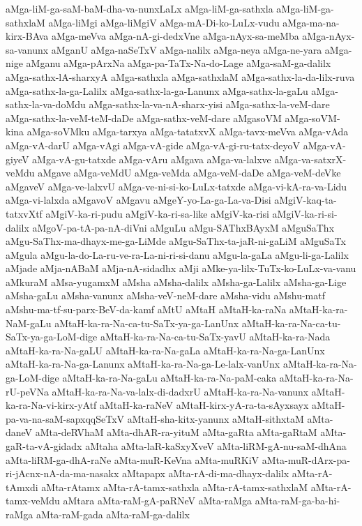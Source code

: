 {aMga-liM-ga-saM-baM-dha-va-nunxLaLx
aMga-liM-ga-sathxla
aMga-liM-ga-sathxlaM
aMga-liMgi
aMga-liMgiV
aMga-mA-Di-ko-LuLx-vudu
aMga-ma-na-kirx-BAva
aMga-meVva
aMga-nA-gi-dedxVne
aMga-nAyx-sa-meMba
aMga-nAyx-sa-vanunx
aMganU
aMga-naSeTxV
aMga-nalilx
aMga-neya
aMga-ne-yara
aMga-nige
aMganu
aMga-pArxNa
aMga-pa-TaTx-Na-do-Lage
aMga-saM-ga-dalilx
aMga-sathx-lA-sharxyA
aMga-sathxla
aMga-sathxlaM
aMga-sathx-la-da-lilx-ruva
aMga-sathx-la-ga-Lalilx
aMga-sathx-la-ga-Lanunx
aMga-sathx-la-gaLu
aMga-sathx-la-va-doMdu
aMga-sathx-la-va-nA-sharx-yisi
aMga-sathx-la-veM-dare
aMga-sathx-la-veM-teM-daDe
aMga-sathx-veM-dare
aMgasoVM
aMga-soVM-kina
aMga-soVMku
aMga-tarxya
aMga-tatatxvX
aMga-tavx-meVva
aMga-vAda
aMga-vA-darU
aMga-vAgi
aMga-vA-gide
aMga-vA-gi-ru-tatx-deyoV
aMga-vA-giyeV
aMga-vA-gu-tatxde
aMga-vAru
aMgava
aMga-va-lalxve
aMga-va-satxrX-veMdu
aMgave
aMga-veMdU
aMga-veMda
aMga-veM-daDe
aMga-veM-deVke
aMgaveV
aMga-ve-lalxvU
aMga-ve-ni-si-ko-LuLx-tatxde
aMga-vi-kA-ra-va-Lidu
aMga-vi-lalxda
aMgavoV
aMgavu
aMgeY-yo-La-ga-La-va-Disi
aMgiV-kaq-ta-tatxvXtf
aMgiV-ka-ri-pudu
aMgiV-ka-ri-sa-like
aMgiV-ka-risi
aMgiV-ka-ri-si-dalilx
aMgoV-pa-tA-pa-nA-diVni
aMguLu
aMgu-SAThxBAyxM
aMguSaThx
aMgu-SaThx-ma-dhayx-me-ga-LiMde
aMgu-SaThx-ta-jaR-ni-gaLiM
aMguSaTx
aMgula
aMgu-la-do-La-ru-ve-ra-La-ni-ri-si-danu
aMgu-la-gaLa
aMgu-li-ga-Lalilx
aMjade
aMja-nABaM
aMja-nA-sidadhx
aMji
aMke-ya-lilx-TuTx-ko-LuLx-va-vanu
aMkuraM
aMsa-yugamxM
aMsha
aMsha-dalilx
aMsha-ga-Lalilx
aMsha-ga-Lige
aMsha-gaLu
aMsha-vanunx
aMsha-veV-neM-dare
aMsha-vidu
aMshu-matf
aMshu-ma-tf-su-parx-BeV-da-kamf
aMtU
aMtaH
aMtaH-ka-raNa
aMtaH-ka-ra-NaM-gaLu
aMtaH-ka-ra-Na-ca-tu-SaTx-ya-ga-LanUnx
aMtaH-ka-ra-Na-ca-tu-SaTx-ya-ga-LoM-dige
aMtaH-ka-ra-Na-ca-tu-SaTx-yavU
aMtaH-ka-ra-Nada
aMtaH-ka-ra-Na-gaLU
aMtaH-ka-ra-Na-gaLa
aMtaH-ka-ra-Na-ga-LanUnx
aMtaH-ka-ra-Na-ga-Lanunx
aMtaH-ka-ra-Na-ga-Le-lalx-vanUnx
aMtaH-ka-ra-Na-ga-LoM-dige
aMtaH-ka-ra-Na-gaLu
aMtaH-ka-ra-Na-paM-caka
aMtaH-ka-ra-Na-rU-peVNa
aMtaH-ka-ra-Na-va-lalx-di-dadxrU
aMtaH-ka-ra-Na-vanunx
aMtaH-ka-ra-Na-vi-kirx-yAtf
aMtaH-ka-raNeV
aMtaH-kirx-yA-ra-ta-sAyxsayx
aMtaH-pa-va-na-saM-sapxqqSeTxV
aMtaH-sha-kitx-yanunx
aMtaH-sithxtaM
aMta-daneV
aMta-deRVhaM
aMta-dhAR-ra-yituM
aMta-gaRta
aMta-gaRtaM
aMta-gaR-ta-vA-gidadx
aMtaha
aMta-laR-kaSxyXveV
aMta-liRM-gA-nu-saM-dhAna
aMta-liRM-ga-dhA-raNe
aMta-muR-KeVna
aMta-muRKiV
aMta-muR-dArx-pa-ri-jAcnx-nA-da-ma-nasakx
aMtapapx
aMta-rA-di-ma-dhayx-dalilx
aMta-rA-tAmxdi
aMta-rAtamx
aMta-rA-tamx-sathxla
aMta-rA-tamx-sathxlaM
aMta-rA-tamx-veMdu
aMtara
aMta-raM-gA-paRNeV
aMta-raMga
aMta-raM-ga-ba-hi-raMga
aMta-raM-gada
aMta-raM-ga-dalilx
}
